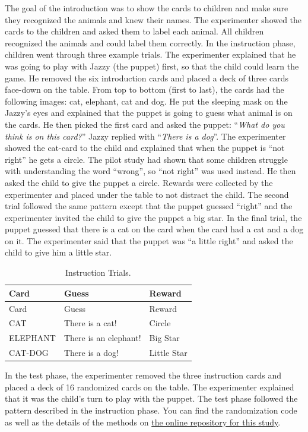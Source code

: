 \documentclass[oneside]{report}
\theoremstyle{definition}
\theoremstyle{definition}
\theoremstyle{definition}
\theoremstyle{remark}
\begin{document}
The goal of the introduction was to show the cards to children and make
sure they recognized the animals and knew their names. The experimenter
showed the cards to the children and asked them to label each animal.
All children recognized the animals and could label them correctly. In
the instruction phase, children went through three example trials. The
experimenter explained that he was going to play with Jazzy (the puppet)
first, so that the child could learn the game. He removed the six
introduction cards and placed a deck of three cards face-down on the
table. From top to bottom (first to last), the cards had the following
images: cat, elephant, cat and dog. He put the sleeping mask on the
Jazzy's eyes and explained that the puppet is going to guess what animal
is on the cards. He then picked the first card and asked the puppet:
``\emph{What do you think is on this card?}'' Jazzy replied with
``\emph{There is a dog}''. The experimenter showed the cat-card to the
child and explained that when the puppet is ``not right'' he gets a
circle. The pilot study had shown that some children struggle with
understanding the word ``wrong'', so ``not right'' was used instead. He
then asked the child to give the puppet a circle. Rewards were collected
by the experimenter and placed under the table to not distract the
child. The second trial followed the same pattern except that the puppet
guessed ``right'' and the experimenter invited the child to give the
puppet a big star. In the final trial, the puppet guessed that there is
a cat on the card when the card had a cat and a dog on it. The
experimenter said that the puppet was ``a little right'' and asked the
child to give him a little star.
\begin{longtable}[]{@{}lll@{}}
\caption{\label{tab:instruction} Instruction Trials.}\tabularnewline
\toprule
Card & Guess & Reward\tabularnewline
\midrule
\endfirsthead
\toprule
Card & Guess & Reward\tabularnewline
\midrule
\endhead
CAT & There is a cat! & Circle\tabularnewline
ELEPHANT & There is an elephant! & Big Star\tabularnewline
CAT-DOG & There is a dog! & Little Star\tabularnewline
\bottomrule
\end{longtable}
In the test phase, the experimenter removed the three instruction cards
and placed a deck of 16 randomized cards on the table. The experimenter
explained that it was the child's turn to play with the puppet. The test
phase followed the pattern described in the instruction phase. You can
find the randomization code as well as the details of the methods on
\href{https://github.com/jasbi/jasbi_dissertation_LearningDisjunction/tree/master/connective_comprehension/study2/0_methods}{the
online repository for this study}.
\end{document}
